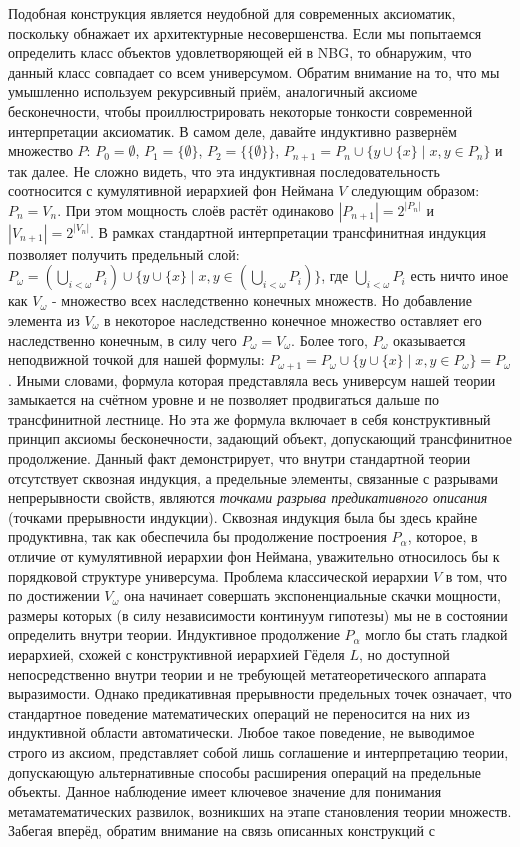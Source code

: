 \documentclass[12pt]{article}
\begin{document}
Подобная конструкция является неудобной для современных аксиоматик, поскольку обнажает их архитектурные несовершенства. Если мы попытаемся определить класс объектов удовлетворяющей ей в NBG, то обнаружим, что данный класс совпадает со всем универсумом. Обратим внимание на то, что мы умышленно используем рекурсивный приём, аналогичный аксиоме бесконечности, чтобы проиллюстрировать некоторые тонкости современной интерпретации аксиоматик. В самом деле, давайте индуктивно развернём множество $P$: $P_0 = \emptyset$, $P_1 = \{ \emptyset \}$, $P_2 = \{ \{ \emptyset \} \}$,  $P_{n + 1} = P_n \cup \{ y \cup \{ x \} \mid x, y \in P_n \}$ и так далее. Не сложно видеть, что эта индуктивная последовательность соотносится с кумулятивной иерархией фон Неймана $V$ следующим образом: $P_n = V_{n}$. При этом мощность слоёв растёт одинаково $|P_{n + 1}| = 2^{|P_n|}$ и $|V_{n + 1}| = 2^{|V_n|}$. В рамках стандартной интерпретации трансфинитная индукция позволяет получить предельный слой: $P_{\omega} = ( \bigcup\limits_{i < \omega} P_i) \cup \{ y \cup \{x\} \mid x, y \in (\bigcup\limits_{i < \omega} P_i) \}$, где $\bigcup\limits_{i < \omega} P_i$ есть ничто иное как $V_{\omega}$ - множество всех наследственно конечных множеств. Но добавление элемента из $V_{\omega}$ в некоторое наследственно конечное множество оставляет его наследственно конечным, в силу чего $P_{\omega} = V_{\omega}$. Более того, $P_{\omega}$ оказывается неподвижной точкой для нашей формулы: $P_{\omega + 1} = P_{\omega} \cup \{ y \cup \{x\} \mid x, y \in P_{\omega}\} = P_{\omega}$. Иными словами, формула которая представляла весь универсум нашей теории замыкается на счётном уровне и не позволяет продвигаться дальше по трансфинитной лестнице. Но эта же формула включает в себя конструктивный принцип аксиомы бесконечности, задающий объект, допускающий трансфинитное продолжение. Данный факт демонстрирует, что внутри стандартной теории отсутствует сквозная индукция, а предельные элементы, связанные с разрывами непрерывности свойств, являются {\it точками разрыва предикативного описания} (точками прерывности индукции). Сквозная индукция была бы здесь крайне продуктивна, так как обеспечила бы продолжение построения $P_{\alpha}$, которое, в отличие от кумулятивной иерархии фон Неймана, уважительно относилось бы к порядковой структуре универсума. Проблема классической иерархии $V$ в том, что по достижении $V_{\omega}$ она начинает совершать экспоненциальные скачки мощности, размеры которых (в силу независимости континуум гипотезы) мы не в состоянии определить внутри теории. Индуктивное продолжение $P_{\alpha}$ могло бы стать гладкой иерархией, схожей с конструктивной иерархией Гёделя $L$, но доступной непосредственно внутри теории и не требующей метатеоретического аппарата выразимости. Однако предикативная прерывности предельных точек означает, что стандартное поведение математических операций не переносится на них из индуктивной области автоматически. Любое такое поведение, не выводимое строго из аксиом, представляет собой лишь соглашение и интерпретацию теории, допускающую альтернативные способы расширения операций на предельные объекты. Данное наблюдение имеет ключевое значение для понимания метаматематических развилок, возникших на этапе становления теории множеств. Забегая вперёд, обратим внимание на связь описанных конструкций с 
\end{document}

